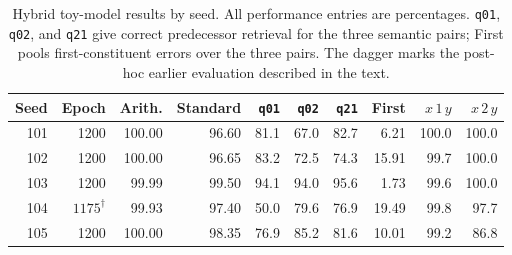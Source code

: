 \begin{table}[!htbp]
\centering
\footnotesize
\setlength{\tabcolsep}{3pt}
\renewcommand{\arraystretch}{1.12}
\caption{Hybrid toy-model results by seed. All performance entries are
percentages. \texttt{q01}, \texttt{q02}, and \texttt{q21} give correct predecessor retrieval for
the three semantic pairs; First pools first-constituent errors over the
three pairs. The dagger marks the post-hoc earlier evaluation described in
the text.}
\label{tab:hybrid-per-seed}
\begin{tabular*}{\linewidth}{@{\extracolsep{\fill}}rrrrrrrrrr@{}}
\toprule
Seed & Epoch & Arith. & Standard & \texttt{q01} & \texttt{q02} & \texttt{q21} & First & \(x\,1\,y\) & \(x\,2\,y\) \\
\midrule
101 & 1200 & 100.00 & 96.60 & 81.1 & 67.0 & 82.7 & 6.21 & 100.0 & 100.0 \\
102 & 1200 & 100.00 & 96.65 & 83.2 & 72.5 & 74.3 & 15.91 & 99.7 & 100.0 \\
103 & 1200 & 99.99 & 99.50 & 94.1 & 94.0 & 95.6 & 1.73 & 99.6 & 100.0 \\
104 & $1175^{\dagger}$ & 99.93 & 97.40 & 50.0 & 79.6 & 76.9 & 19.49 & 99.8 & 97.7 \\
105 & 1200 & 100.00 & 98.35 & 76.9 & 85.2 & 81.6 & 10.01 & 99.2 & 86.8 \\
\bottomrule
\end{tabular*}
\end{table}

